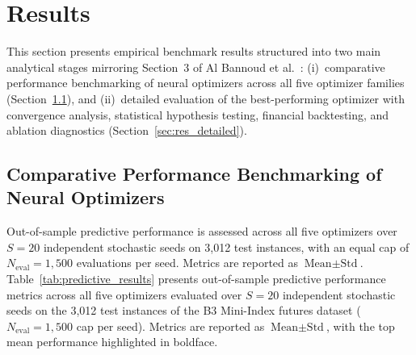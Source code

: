 
\section{Results}\label{sec:results}

This section presents empirical benchmark results structured into two main analytical stages mirroring Section~3 of Al Bannoud et al.\ \cite{al_bannoud2026accelerating}: (i)~comparative performance benchmarking of neural optimizers across all five optimizer families (Section~\ref{sec:res_benchmarking}), and (ii)~detailed evaluation of the best-performing optimizer with convergence analysis, statistical hypothesis testing, financial backtesting, and ablation diagnostics (Section~\ref{sec:res_detailed}).

\subsection{Comparative Performance Benchmarking of Neural Optimizers}\label{sec:res_benchmarking}

\ifdefined\methodresultscompact
Out-of-sample predictive performance is assessed across all five optimizers over $S = 20$ independent stochastic seeds on 3,012 test instances, with an equal cap of $N_{\text{eval}} = 1{,}500$ evaluations per seed. Metrics are reported as $\text{Mean} \pm \text{Std}$.
\else
Table~\ref{tab:predictive_results} presents out-of-sample predictive performance metrics across all five optimizers evaluated over $S = 20$ independent stochastic seeds on the 3,012 test instances of the B3 Mini-Index futures dataset ($N_{\text{eval}} = 1{,}500$ cap per seed). Metrics are reported as $\text{Mean} \pm \text{Std}$, with the top mean performance highlighted in boldface.
\fi


